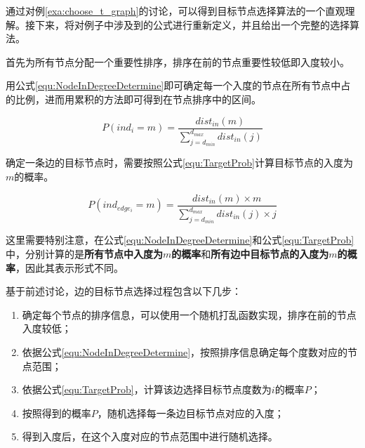 通过对例\ref{exa:choose_t_graph}的讨论，可以得到目标节点选择算法的一个直观理解。接下来，将对例子中涉及到的公式进行重新定义，并且给出一个完整的选择算法。



首先为所有节点分配一个重要性排序，排序在前的节点重要性较低即入度较小。

用公式\ref{equ:NodeInDegreeDetermine}即可确定每一个入度的节点在所有节点中占的比例，进而用累积的方法即可得到在节点排序中的区间。

\vspace{-8mm}

\begin{equation}
  \label{equ:NodeInDegreeDetermine}
  P\left(ind_i=m\right)=\frac{dist_{in}(m)}{\sum\limits_{j=d_{min}}^{d_{max}}dist_{in}(j)}
\end{equation}

确定一条边的目标节点时，需要按照公式\ref{equ:TargetProb}计算目标节点的入度为$m$的概率。

\vspace{-8mm}

\begin{equation}
  \label{equ:TargetProb}
  P\left(ind_{edge_i}=m\right)=\frac{dist_{in}(m) \times m}{\sum\limits_{j=d_{min}}^{d_{max}}dist_{in}(j)\times j}
\end{equation}

这里需要特别注意，在公式\ref{equ:NodeInDegreeDetermine}和公式\ref{equ:TargetProb}中，分别计算的是\textbf{所有节点中入度为$m$的概率}和\textbf{所有边中目标节点的入度为$m$的概率}，因此其表示形式不同。

基于前述讨论，边的目标节点选择过程包含以下几步：

\begin{enumerate}
  \item 确定每个节点的排序信息，可以使用一个随机打乱函数实现，排序在前的节点入度较低；
  \item 依据公式\ref{equ:NodeInDegreeDetermine}，按照排序信息确定每个度数对应的节点范围；
  \item 依据公式\ref{equ:TargetProb}，计算该边选择目标节点度数为$i$的概率$P$；
  \item 按照得到的概率$P$，随机选择每一条边目标节点对应的入度；
  \item 得到入度后，在这个入度对应的节点范围中进行随机选择。
\end{enumerate}

